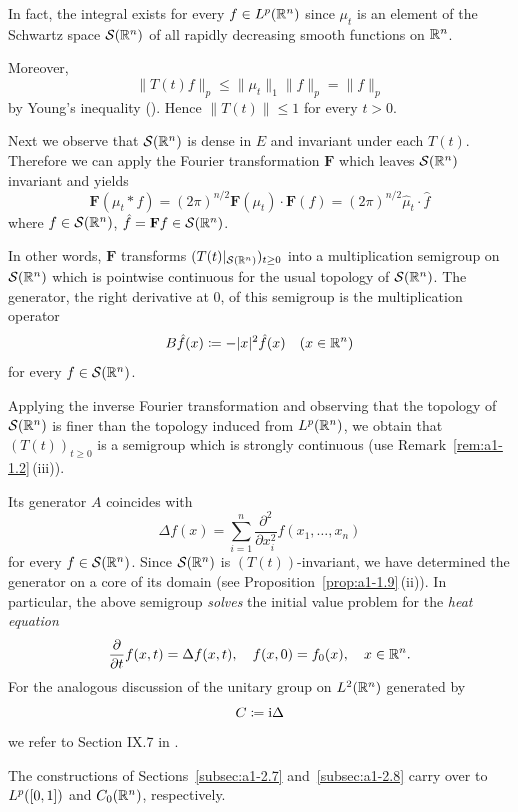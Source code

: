 In fact, the integral exists for every $f \in L^{p}(\mathbb{R}^{n})$ since $\mu_{t}$ is an element of the Schwartz space $\mathcal{S}(\mathbb{R}^{n})$ of all rapidly decreasing smooth functions on $\mathbb{R}^{n}$.

Moreover,
\[
    \|T(t)f\|_{p} \leq \|\mu_{t}\|_{1}\|f\|_{p} = \|f\|_{p}
\]
by Young's inequality (\textcite[p.~28]{reedsimon:1975}). Hence $\|T(t)\| \leq 1$ for every $t > 0$.

Next we observe that $\mathcal{S}(\mathbb{R}^{n})$ is dense in $E$ and invariant under each $T(t)$.
Therefore we can apply the Fourier transformation $\mathbf{F}$ which leaves $\mathcal{S}(\mathbb{R}^{n})$ invariant and yields
\[
    \mathbf{F}(\mu_{t}*f) = (2\pi)^{n/2} \mathbf{F}(\mu_{t}) \cdot \mathbf{F}(f) 
    = (2\pi)^{n/2} \hat{\mu}_{t}\cdot\hat{f}
\]
where $f \in \mathcal{S}(\mathbb{R}^{n})$, $\hat{f} = \mathbf{F}f \in \mathcal{S}(\mathbb{R}^{n})$.

In other words, $\mathbf{F}$ transforms $(T(t)\vert_{\mathcal{S}(\R^{n})})_{t \geq 0}$ into a multiplication semigroup on $\mathcal{S}(\mathbb{R}^{n})$ which is pointwise continuous for the usual topology of\/ $\mathcal{S}(\mathbb{R}^{n})$.
The generator, \ie the right derivative at $0$, of this semigroup is the multiplication operator
\[
    B\hat{f}(x) \coloneq -|x|^{2}\hat{f}(x) \quad (x \in \mathbb{R}^{n})
\]
for every $f \in \mathcal{S}(\mathbb{R}^{n})$.

Applying the inverse Fourier transformation and observing that the topology of\/ $\mathcal{S}(\mathbb{R}^{n})$ is finer than the topology induced from $L^{p}(\mathbb{R}^{n})$, we obtain that $(T(t))_{t \geq 0}$ is a semigroup which is strongly continuous (use Remark~\ref{rem:a1-1.2}\,(iii)).

Its generator $A$ coincides with
\[
    \Delta f(x) = \sum_{i=1}^{n} \frac{\partial^{2}}{\partial x_{i}^{2}} f(x_{1},\ldots,x_{n})
\]
for every $f \in \mathcal{S}(\mathbb{R}^{n})$.
Since $\mathcal{S}(\mathbb{R}^{n})$ is $(T(t))$-invariant, we have determined the generator on a core of its domain (see Proposition~\ref{prop:a1-1.9}\,(ii)).
In particular, the above semigroup \emph{solves} the initial value problem for the \emph{heat equation}
\[
    \frac{\partial}{\partial t} f(x,t) = \Delta f(x,t), \quad f(x,0) = f_{0}(x), \quad x \in \mathbb{R}^{n}.
\]
For the analogous discussion of the unitary group on $L^{2}(\mathbb{R}^{n})$ generated by
\[
    C \coloneq \mathrm{i}\Delta
\]
we refer to Section IX.7 in \textcite{reedsimon:1975}. 

The constructions of Sections~\ref{subsec:a1-2.7} 
and~\ref{subsec:a1-2.8} carry over to $L^{p}(\left[ 0,1 \right])$ 
and $C_{0}(\mathbb{R}^{n})$, respectively.
